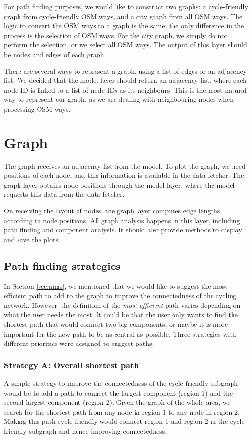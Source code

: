 \documentclass[12pt,a4paper]{report}
\begin{document}
For path finding purposes, we would like to construct two graphs: a cycle-friendly graph from cycle-friendly OSM ways, and a city graph from all OSM ways. The logic to convert the OSM ways to a graph is the same; the only difference in the process is the selection of OSM ways. For the city graph, we simply do not perform the selection, or we select all OSM ways. The output of this layer should be nodes and edges of each graph.

There are several ways to represent a graph, using a list of edges or an adjacency list. We decided that the model layer should return an adjacency list, where each node ID is linked to a list of node IDs as its neighbours. This is the most natural way to represent our graph, as we are dealing with neighbouring nodes when processing OSM ways.

\section{Graph}
The graph receives an adjacency list from the model. To plot the graph, we need positions of each node, and this information is available in the data fetcher. The graph layer obtains node positions through the model layer, where the model requests this data from the data fetcher.

On receiving the layout of nodes, the graph layer computes edge lengths according to node positions. All graph analysis happens in this layer, including path finding and component analysis. It should also provide methods to display and save the plots.

\subsection{Path finding strategies} \label{sec:strategies}
In Section \ref{sec:aims}, we mentioned that we would like to suggest the most efficient path to add to the graph to improve the connectedness of the cycling network. However, the definition of the \textit{most efficient} path varies depending on what the user needs the most. It could be that the user only wants to find the shortest path that would connect two big components, or maybe it is more important for the new path to be as central as possible. Three strategies with different priorities were designed to suggest paths.

\subsubsection*{Strategy A: Overall shortest path}
A simple strategy to improve the connectedness of the cycle-friendly subgraph would be to add a path to connect the largest component (region 1) and the second largest component (region 2). Given the graph of the whole area, we search for the shortest path from any node in region 1 to any node in region 2. Making this path cycle-friendly would connect region 1 and region 2 in the cycle-friendly subgraph and hence improving connectedness.
\end{document}
